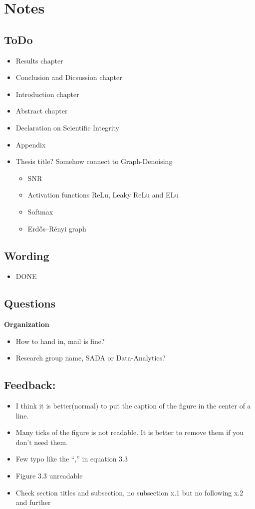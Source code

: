 \chapter{Notes}

\section{ToDo}
\begin{itemize}
    \item Results chapter
    \item Conclusion and Dicsussion chapter
    \item Introduction chapter
    \item Abstract chapter
    \item Declaration on Scientific Integrity
    \item Appendix
    \item Thesis title? Somehow connect to Graph-Denoising
    \begin{itemize}
        \item SNR
        \item Activation functions ReLu,  Leaky ReLu and ELu
        \item Softmax
        \item Erdős–Rényi graph
    \end{itemize}
\end{itemize}

\section{Wording}
\begin{itemize}
    \item DONE
\end{itemize}

\section{Questions}
\textbf{Organization}
\begin{itemize}
    \item How to hand in, mail is fine?
    \item Research group name, SADA or Data-Analytics?
\end{itemize}


\section{Feedback:}
\begin{itemize}
    \item I think it is better(normal) to put the caption of the figure in the center of a line.
    \item Many ticks of the figure is not readable. It is better to remove them if you don’t need them.
    \item Few typo like the “,” in equation 3.3
    \item Figure 3.3 unreadable
    \item Check section titles and subsection, no subsection x.1 but no following x.2 and further
\end{itemize}

